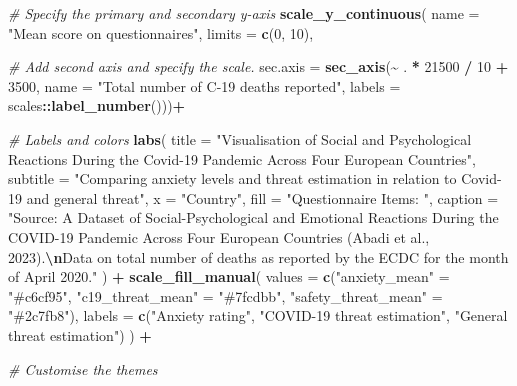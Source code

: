 \documentclass[
]{article}
\newenvironment{Shaded}{\begin{snugshade}}{\end{snugshade}}
\newcommand{\AttributeTok}[1]{\textcolor[rgb]{0.13,0.29,0.53}{#1}}
\newcommand{\CommentTok}[1]{\textcolor[rgb]{0.56,0.35,0.01}{\textit{#1}}}
\newcommand{\DecValTok}[1]{\textcolor[rgb]{0.00,0.00,0.81}{#1}}
\newcommand{\FunctionTok}[1]{\textcolor[rgb]{0.13,0.29,0.53}{\textbf{#1}}}
\newcommand{\NormalTok}[1]{#1}
\newcommand{\OtherTok}[1]{\textcolor[rgb]{0.56,0.35,0.01}{#1}}
\newcommand{\SpecialCharTok}[1]{\textcolor[rgb]{0.81,0.36,0.00}{\textbf{#1}}}
\newcommand{\StringTok}[1]{\textcolor[rgb]{0.31,0.60,0.02}{#1}}
\begin{document}
\begin{Shaded}
\begin{Highlighting}[]
  \CommentTok{\# Specify the primary and secondary y{-}axis}
    \FunctionTok{scale\_y\_continuous}\NormalTok{(}
    \AttributeTok{name =} \StringTok{"Mean score on questionnaires"}\NormalTok{,}
    \AttributeTok{limits =} \FunctionTok{c}\NormalTok{(}\DecValTok{0}\NormalTok{, }\DecValTok{10}\NormalTok{),}
    
  \CommentTok{\# Add second axis and specify the scale. }
    \AttributeTok{sec.axis =} \FunctionTok{sec\_axis}\NormalTok{(}\SpecialCharTok{\textasciitilde{}}\NormalTok{ . }\SpecialCharTok{*} \DecValTok{21500} \SpecialCharTok{/} \DecValTok{10} \SpecialCharTok{+} \DecValTok{3500}\NormalTok{, }
      \AttributeTok{name =} \StringTok{"Total number of C{-}19 deaths reported"}\NormalTok{,}
      \AttributeTok{labels =}\NormalTok{ scales}\SpecialCharTok{::}\FunctionTok{label\_number}\NormalTok{()))}\SpecialCharTok{+}
  
  \CommentTok{\# Labels and colors}
  \FunctionTok{labs}\NormalTok{(}
    \AttributeTok{title =} \StringTok{"Visualisation of Social and Psychological Reactions During the Covid{-}19 Pandemic Across Four European Countries"}\NormalTok{,}
    \AttributeTok{subtitle =} \StringTok{"Comparing anxiety levels and threat estimation in relation to Covid{-}19 and general threat"}\NormalTok{,}
    \AttributeTok{x =} \StringTok{"Country"}\NormalTok{,}
    \AttributeTok{fill =} \StringTok{"Questionnaire Items:  "}\NormalTok{,}
    \AttributeTok{caption =} \StringTok{"Source: A Dataset of Social{-}Psychological and Emotional Reactions During the COVID{-}19 Pandemic Across Four European Countries (Abadi et al., 2023).}\SpecialCharTok{\textbackslash{}n}\StringTok{Data on total number of deaths as reported by the ECDC for the month of April 2020."}
\NormalTok{  ) }\SpecialCharTok{+}
  \FunctionTok{scale\_fill\_manual}\NormalTok{(}
    \AttributeTok{values =} \FunctionTok{c}\NormalTok{(}\StringTok{"anxiety\_mean"} \OtherTok{=} \StringTok{"\#c6cf95"}\NormalTok{, }\StringTok{"c19\_threat\_mean"} \OtherTok{=} \StringTok{"\#7fcdbb"}\NormalTok{, }\StringTok{"safety\_threat\_mean"} \OtherTok{=} \StringTok{"\#2c7fb8"}\NormalTok{),}
    \AttributeTok{labels =} \FunctionTok{c}\NormalTok{(}\StringTok{"Anxiety rating"}\NormalTok{, }\StringTok{"COVID{-}19 threat estimation"}\NormalTok{, }\StringTok{"General threat estimation"}\NormalTok{)}
\NormalTok{  ) }\SpecialCharTok{+}
  
  \CommentTok{\# Customise the themes}
  

\end{Highlighting}
\end{Shaded}
\end{document}
